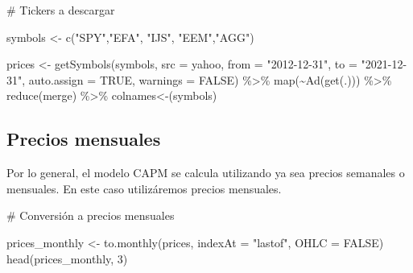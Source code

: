 \documentclass[
  letterpaper,
  DIV=11,
  numbers=noendperiod]{scrartcl}
\newenvironment{Shaded}{\begin{snugshade}}{\end{snugshade}}
\newcommand{\AttributeTok}[1]{\textcolor[rgb]{0.40,0.45,0.13}{#1}}
\newcommand{\CommentTok}[1]{\textcolor[rgb]{0.37,0.37,0.37}{#1}}
\newcommand{\ConstantTok}[1]{\textcolor[rgb]{0.56,0.35,0.01}{#1}}
\newcommand{\DecValTok}[1]{\textcolor[rgb]{0.68,0.00,0.00}{#1}}
\newcommand{\FunctionTok}[1]{\textcolor[rgb]{0.28,0.35,0.67}{#1}}
\newcommand{\NormalTok}[1]{\textcolor[rgb]{0.00,0.23,0.31}{#1}}
\newcommand{\OtherTok}[1]{\textcolor[rgb]{0.00,0.23,0.31}{#1}}
\newcommand{\SpecialCharTok}[1]{\textcolor[rgb]{0.37,0.37,0.37}{#1}}
\newcommand{\StringTok}[1]{\textcolor[rgb]{0.13,0.47,0.30}{#1}}
\begin{document}
\begin{Shaded}
\begin{Highlighting}[]
\CommentTok{\# Tickers a descargar}

\NormalTok{symbols }\OtherTok{\textless{}{-}} \FunctionTok{c}\NormalTok{(}\StringTok{"SPY"}\NormalTok{,}\StringTok{"EFA"}\NormalTok{, }\StringTok{"IJS"}\NormalTok{, }\StringTok{"EEM"}\NormalTok{,}\StringTok{"AGG"}\NormalTok{)}

\NormalTok{prices }\OtherTok{\textless{}{-}}
  \FunctionTok{getSymbols}\NormalTok{(symbols,}
             \AttributeTok{src =} \StringTok{\textquotesingle{}yahoo\textquotesingle{}}\NormalTok{,}
             \AttributeTok{from =} \StringTok{"2012{-}12{-}31"}\NormalTok{,}
             \AttributeTok{to =} \StringTok{"2021{-}12{-}31"}\NormalTok{,}
             \AttributeTok{auto.assign =} \ConstantTok{TRUE}\NormalTok{,}
             \AttributeTok{warnings =} \ConstantTok{FALSE}\NormalTok{) }\SpecialCharTok{\%\textgreater{}\%}
  \FunctionTok{map}\NormalTok{(}\SpecialCharTok{\textasciitilde{}}\FunctionTok{Ad}\NormalTok{(}\FunctionTok{get}\NormalTok{(.))) }\SpecialCharTok{\%\textgreater{}\%}
  \FunctionTok{reduce}\NormalTok{(merge) }\SpecialCharTok{\%\textgreater{}\%}
  \StringTok{\textasciigrave{}}\AttributeTok{colnames\textless{}{-}}\StringTok{\textasciigrave{}}\NormalTok{(symbols)}
\end{Highlighting}
\end{Shaded}

\subsection{Precios mensuales}\label{precios-mensuales}

Por lo general, el modelo CAPM se calcula utilizando ya sea precios
semanales o mensuales. En este caso utilizáremos precios mensuales.

\begin{Shaded}
\begin{Highlighting}[]
\CommentTok{\# Conversión a precios mensuales}

\NormalTok{prices\_monthly }\OtherTok{\textless{}{-}} \FunctionTok{to.monthly}\NormalTok{(prices,}
                             \AttributeTok{indexAt =} \StringTok{"lastof"}\NormalTok{,}
                             \AttributeTok{OHLC =} \ConstantTok{FALSE}\NormalTok{)}
\FunctionTok{head}\NormalTok{(prices\_monthly, }\DecValTok{3}\NormalTok{)}
\end{Highlighting}
\end{Shaded}
\end{document}
